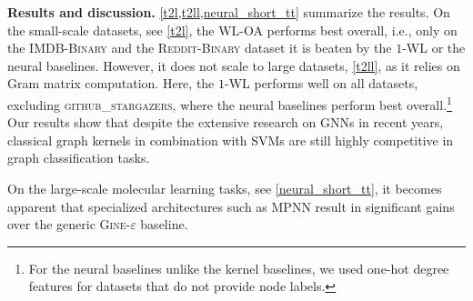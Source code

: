 \documentclass{article}
\newcommand{\xhdr}[1]{{\noindent\bfseries #1}}
\theoremstyle{definition}
\begin{document}
\xhdr{Results and discussion.}
\cref{t2l,t2ll,neural_short_tt} summarize the results. On the small-scale datasets, see \cref{t2l}, the \textsc{WL-OA} performs best overall, i.e., only on the \textsc{IMDB-Binary} and the \textsc{Reddit-Binary} dataset it is beaten by the $1$-\textsc{WL} or the neural baselines. However, it does not scale to large datasets, \cref{t2ll}, as it relies on Gram matrix computation. Here, the $1$-WL performs well on all datasets, excluding \textsc{github\_stargazers}, where the neural baselines perform best overall.\footnote{For the neural baselines unlike the kernel baselines, we used one-hot degree features for datasets that do not provide node labels.}
Our results show that despite the extensive research on GNNs in recent years, classical graph kernels in combination with SVMs are still highly competitive in graph classification tasks.
\begin{table}[]\centering	
	\caption{Mean MAE (mean std. MAE, logMAE) on large-scale (multi-target) molecular regression tasks.\label{neural_short_tt}}
\end{table}		
On the large-scale molecular learning tasks, see \cref{neural_short_tt}, it becomes apparent that specialized architectures such as \textsc{MPNN} result in significant gains over the generic \textsc{Gine-$\varepsilon$} baseline. 
\end{document}
